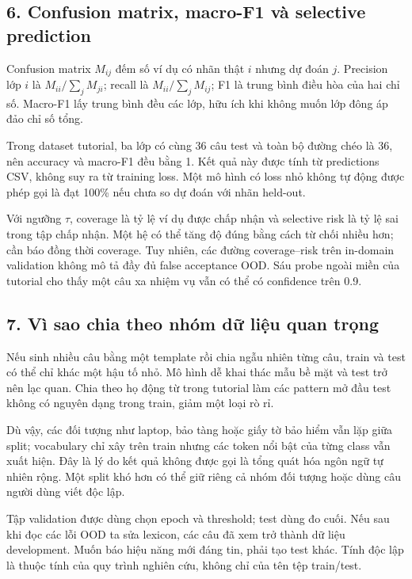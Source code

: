 \subsection{6. Confusion matrix, macro-F1 và selective
prediction}\label{confusion-matrix-macro-f1-vuxe0-selective-prediction}

Confusion matrix \(M_{ij}\) đếm số ví dụ có nhãn thật \(i\) nhưng dự
đoán \(j\). Precision lớp \(i\) là \(M_{ii}/\sum_jM_{ji}\); recall là
\(M_{ii}/\sum_jM_{ij}\); F1 là trung bình điều hòa của hai chỉ số.
Macro-F1 lấy trung bình đều các lớp, hữu ích khi không muốn lớp đông áp
đảo chỉ số tổng.

Trong dataset tutorial, ba lớp có cùng 36 câu test và toàn bộ đường chéo
là 36, nên accuracy và macro-F1 đều bằng 1. Kết quả này được tính từ
predictions CSV, không suy ra từ training loss. Một mô hình có loss nhỏ
không tự động được phép gọi là đạt 100\% nếu chưa so dự đoán với nhãn
held-out.

Với ngưỡng \(\tau\), coverage là tỷ lệ ví dụ được chấp nhận và selective
risk là tỷ lệ sai trong tập chấp nhận. Một hệ có thể tăng độ đúng bằng
cách từ chối nhiều hơn; cần báo đồng thời coverage. Tuy nhiên, các đường
coverage--risk trên in-domain validation không mô tả đầy đủ false
acceptance OOD. Sáu probe ngoài miền của tutorial cho thấy một câu xa
nhiệm vụ vẫn có thể có confidence trên 0.9.

\subsection{7. Vì sao chia theo nhóm dữ liệu quan
trọng}\label{vuxec-sao-chia-theo-nhuxf3m-dux1eef-liux1ec7u-quan-trux1ecdng}

Nếu sinh nhiều câu bằng một template rồi chia ngẫu nhiên từng câu, train
và test có thể chỉ khác một hậu tố nhỏ. Mô hình dễ khai thác mẫu bề mặt
và test trở nên lạc quan. Chia theo họ động từ trong tutorial làm các
pattern mở đầu test không có nguyên dạng trong train, giảm một loại rò
rỉ.

Dù vậy, các đối tượng như laptop, bảo tàng hoặc giấy tờ bảo hiểm vẫn lặp
giữa split; vocabulary chỉ xây trên train nhưng các token nổi bật của
từng class vẫn xuất hiện. Đây là lý do kết quả không được gọi là tổng
quát hóa ngôn ngữ tự nhiên rộng. Một split khó hơn có thể giữ riêng cả
nhóm đối tượng hoặc dùng câu người dùng viết độc lập.

Tập validation được dùng chọn epoch và threshold; test dùng đo cuối. Nếu
sau khi đọc các lỗi OOD ta sửa lexicon, các câu đã xem trở thành dữ liệu
development. Muốn báo hiệu năng mới đáng tin, phải tạo test khác. Tính
độc lập là thuộc tính của quy trình nghiên cứu, không chỉ của tên tệp
train/test.

